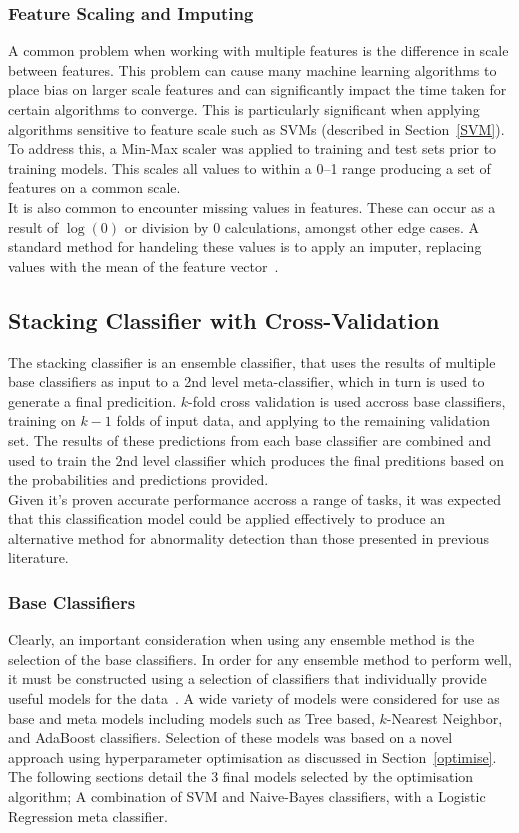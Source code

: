 \documentclass[titlepage, 12pt]{scrartcl} \usepackage{enumitem}
\begin{document}
\subsubsection{Feature Scaling and Imputing}
A common problem when working with multiple features is the difference in scale
between features. This problem can cause many machine learning algorithms to place
bias on larger scale features and can significantly impact the time taken for
certain algorithms to converge. This is particularly significant when applying
algorithms sensitive to feature scale such as SVMs (described in
Section~\ref{SVM}). To address this, a Min-Max scaler was applied
to training and test sets prior to training models. This scales all values to within a
0--1 range producing a set of features on a common scale.\\
It is also common to encounter missing values in features. These can occur as a
result of $\log(0)$ or division by 0 calculations, amongst other edge cases. A
standard method for handeling these values is to apply an imputer, replacing
values with the mean of the feature vector~\parencite{VanderPlas2017}.

\subsection{Stacking Classifier with Cross-Validation}\label{class}
The stacking classifier is an ensemble classifier, that uses the results of
multiple base classifiers as input to a 2nd level meta-classifier, which in
turn is used to generate a final predicition. $k$-fold cross validation is used
accross base classifiers, training on $k-1$ folds of input data, and applying
to the remaining validation set. The results of these predictions from each
base classifier are combined and used to train the 2nd level classifier which
produces the final preditions based on the probabilities and predictions
provided.\\
Given it's proven accurate performance accross a range of tasks, it was
expected that this classification model could be applied effectively to produce
an alternative method for abnormality detection than those presented in
previous literature.

\subsubsection{Base Classifiers}
Clearly, an important consideration when using any ensemble method is the
selection of the base classifiers. In order for any ensemble method to perform
well, it must be constructed using a selection of classifiers that individually
provide useful models for the data~\parencite[p.484]{Tobergte2013a}.   A wide
variety of models were considered for use as base and meta models including
models such as Tree based, $k$-Nearest Neighbor, and AdaBoost classifiers.
Selection of these models was based on a novel approach using hyperparameter
optimisation as discussed in Section~\ref{optimise}. The following sections
detail the 3 final models selected by the optimisation algorithm; A combination
of SVM and Naive-Bayes classifiers, with a Logistic Regression meta classifier.
\end{document}
